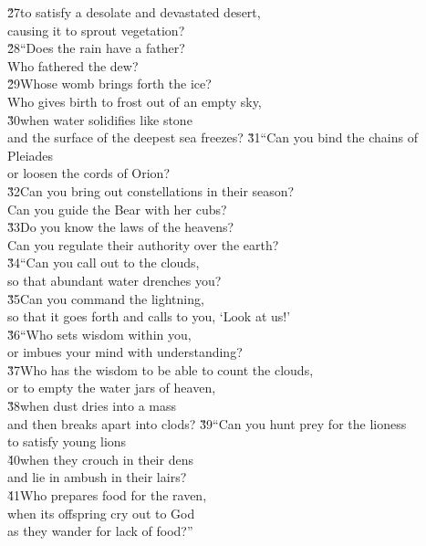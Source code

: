 \begin{poetry}
\poeml \v{27}to satisfy a desolate and devastated desert, \\
\poemll    causing it to sprout vegetation? \\
\poeml \v{28}``Does the rain have a father? \\
\poemll    Who fathered the dew? \\
\poeml \v{29}Whose womb brings forth the ice? \\
\poemll    Who gives birth to frost out of an empty sky, \\
\poeml \v{30}when water solidifies like stone \\
\poemll    and the surface of the deepest sea freezes?
\poeml \v{31}``Can you bind the chains of Pleiades \\
\poemll    or loosen the cords of Orion? \\
\poeml \v{32}Can you bring out constellations in their season? \\
\poemll    Can you guide the Bear with her cubs? \\
\poeml \v{33}Do you know the laws of the heavens? \\
\poemll    Can you regulate their authority over the earth? \\
\poeml \v{34}``Can you call out to the clouds, \\
\poemll    so that abundant water drenches you? \\
\poeml \v{35}Can you command the lightning, \\
\poemll    so that it goes forth and calls to you, `Look at us!' \\
\poeml \v{36}``Who sets wisdom within you, \\
\poemll    or imbues your mind with understanding? \\
\poeml \v{37}Who has the wisdom to be able to count the clouds, \\
\poemll    or to empty the water jars of heaven, \\
\poeml \v{38}when dust dries into a mass \\
\poemll    and then breaks apart into clods?
\poeml \v{39}``Can you hunt prey for the lioness \\
\poemll    to satisfy young lions \\
\poeml \v{40}when they crouch in their dens \\
\poemll    and lie in ambush in their lairs? \\
\poeml \v{41}Who prepares food for the raven, \\
\poemll    when its offspring cry out to God \\
\poemlll       as they wander for lack of food?''
\end{poetry}

